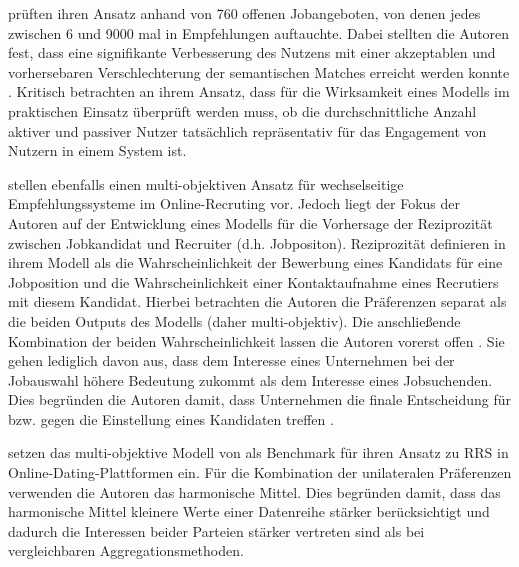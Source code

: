 \textcite[S. 15f.]{rodriguez:inproceedings} prüften ihren Ansatz anhand von 760 offenen Jobangeboten, von denen jedes zwischen 6 und 9000 mal in Empfehlungen auftauchte.
Dabei stellten die Autoren fest, dass eine signifikante Verbesserung des Nutzens mit einer akzeptablen und vorhersebaren Verschlechterung der semantischen Matches erreicht werden konnte \cite[S. 11]{rodriguez:inproceedings}.
Kritisch betrachten \textcite[S. 16]{rodriguez:inproceedings} an ihrem Ansatz, dass für die Wirksamkeit eines Modells im praktischen Einsatz überprüft werden muss, ob die durchschnittliche Anzahl aktiver und passiver Nutzer tatsächlich repräsentativ für das Engagement von Nutzern in einem System ist.

\textcite[S. 1467ff.]{yildirim:article} stellen ebenfalls einen multi-objektiven Ansatz für wechselseitige Empfehlungssysteme im Online-Recruting vor.
Jedoch liegt der Fokus der Autoren auf der Entwicklung eines Modells für die Vorhersage der Reziprozität zwischen Jobkandidat und Recruiter (d.h. Jobpositon).
Reziprozität definieren \textcite[S. 1470]{yildirim:article} in ihrem Modell als die Wahrscheinlichkeit der Bewerbung eines Kandidats für eine Jobposition und die Wahrscheinlichkeit einer Kontaktaufnahme eines Recrutiers mit diesem Kandidat.
Hierbei betrachten die Autoren die Präferenzen separat als die beiden Outputs des Modells (daher multi-objektiv).
Die anschließende Kombination der beiden Wahrscheinlichkeit lassen die Autoren vorerst offen \cite[S. 1474]{yildirim:article}.
Sie gehen lediglich davon aus, dass dem Interesse eines Unternehmen bei der Jobauswahl höhere Bedeutung zukommt als dem Interesse eines Jobsuchenden.
Dies begründen die Autoren damit, dass Unternehmen die finale Entscheidung für bzw. gegen die Einstellung eines Kandidaten treffen \cite[S. 1470]{yildirim:article}.

\textcite[S. 705ff.]{kumari:article} setzen das multi-objektive Modell von \textcite[S. 1467ff.]{yildirim:article} als Benchmark für ihren Ansatz zu \ac{RRS} in Online-Dating-Plattformen ein.
Für die Kombination der unilateralen Präferenzen verwenden die Autoren das harmonische Mittel.
Dies begründen \textcite[S. 724]{kumari:article} damit, dass das harmonische Mittel kleinere Werte einer Datenreihe stärker berücksichtigt und dadurch die Interessen beider Parteien stärker vertreten sind als bei vergleichbaren Aggregationsmethoden.

